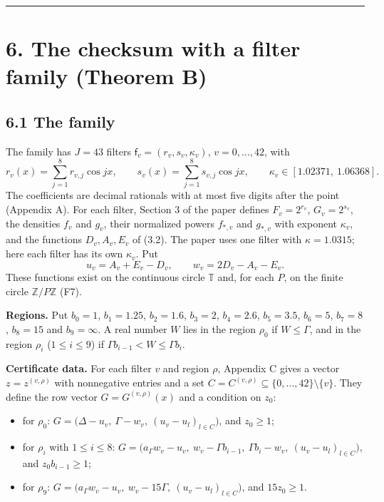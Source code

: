 \documentclass[10pt,a4paper]{article}
\begin{document}
\medskip\noindent\rule{\linewidth}{0.4pt}\medskip

\section*{6. The checksum with a filter family (Theorem B)}

\subsection*{6.1 The family}

The family has $J = 43$ filters $\mathsf f_v = (r_v, s_v, \kappa_v)$, $v = 0, \dots, 42$, with
\[r_v(x) = \sum_{j=1}^8 r_{v,j}\cos jx,\qquad s_v(x) = \sum_{j=1}^8 s_{v,j}\cos jx,\qquad \kappa_v \in [1.02371,\ 1.06368].\]
The coefficients are decimal rationals with at most five digits after the point (Appendix A). For each filter, Section 3 of the paper defines $F_v = 2^{r_v}$, $G_v = 2^{s_v}$, the
densities $f_v$ and $g_v$, their normalized powers $f_{*,v}$ and $g_{*,v}$ with exponent $\kappa_v$, and the functions
$D_v, A_v, E_v$ of (3.2). The paper uses one filter with $\kappa = 1.0315$; here each filter has its own $\kappa_v$. Put
\[u_v = A_v + E_v - D_v,\qquad w_v = 2D_v - A_v - E_v.\]
These functions exist on the continuous circle $\mathbb T$ and, for each $P$, on the finite circle $\mathbb Z/P\mathbb Z$
(F7).

\textbf{Regions.} Put $b_0 = 1$, $b_1 = 1.25$, $b_2 = 1.6$, $b_3 = 2$, $b_4 = 2.6$, $b_5 = 3.5$, $b_6 = 5$, $b_7 = 8$,
$b_8 = 15$ and $b_9 = \infty$. A real number $W$ lies in the region $\rho_0$ if $W \le \Gamma$, and in the region
$\rho_i$ ($1 \le i \le 9$) if $\Gamma b_{i-1} < W \le \Gamma b_i$.

\textbf{Certificate data.} For each filter $v$ and region $\rho$, Appendix C gives a vector $z = z^{(v,\rho)}$ with
nonnegative entries and a set $C = C^{(v,\rho)} \subseteq \{0, \dots, 42\}\setminus\{v\}$. They define the row vector
$G = G^{(v,\rho)}(x)$ and a condition on $z_0$:

\begin{itemize}
\item for $\rho_0$: $G = \big(\Delta - u_v,\ \Gamma - w_v,\ (u_v - u_l)_{l\in C}\big)$, and $z_0 \ge 1$;
\item for $\rho_i$ with $1 \le i \le 8$: $G = \big(a_\Gamma w_v - u_v,\ w_v - \Gamma b_{i-1},\ \Gamma b_i - w_v,\ (u_v - u_l)_{l\in C}\big)$, and $z_0b_{i-1} \ge 1$;
\item for $\rho_9$: $G = \big(a_\Gamma w_v - u_v,\ w_v - 15\Gamma,\ (u_v - u_l)_{l\in C}\big)$, and $15z_0 \ge 1$.
\end{itemize}
\end{document}
